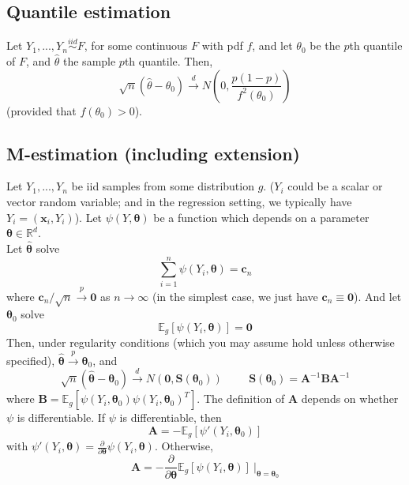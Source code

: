 \documentclass[11pt]{article}
\begin{document}
\subsection*{Quantile estimation}

Let $Y_1,...,Y_n \overset{iid}{\sim} F$, for some continuous $F$ with pdf $f$, and let $\theta_0$ be the $p$th quantile of $F$, and $\widehat{\theta}$ the sample $p$th quantile. Then,
$$\sqrt{n}(\widehat{\theta} - \theta_0) \overset{d}{\to} N\left(0, \frac{p(1-p)}{f^2(\theta_0)} \right)$$
(provided that $f(\theta_0) > 0$).

\subsection*{M-estimation (including extension)}

Let $Y_1,...,Y_n$ be iid samples from some distribution $g$. ($Y_i$ could be a scalar or vector random variable; and in the regression setting, we typically have $Y_i = (\mathbf{x}_i, Y_i)$). Let $\psi(Y, \boldsymbol{\theta})$ be a function which depends on a parameter $\boldsymbol{\theta} \in \mathbb{R}^d$.\\

\noindent Let $\widehat{\boldsymbol{\theta}}$ solve
$$\sum \limits_{i=1}^n \psi(Y_i, \boldsymbol{\theta}) = \boldsymbol{c}_n$$
where $\boldsymbol{c}_n/\sqrt{n} \overset{p}{\to} \boldsymbol{0}$ as $n \to \infty$ (in the simplest case, we just have $\boldsymbol{c}_n \equiv \boldsymbol{0}$). And let $\boldsymbol{\theta}_0$ solve
$$\mathbb{E}_g[\psi(Y_i, \boldsymbol{\theta})] = \boldsymbol{0}$$
Then, under regularity conditions (which you may assume hold unless otherwise specified), $\widehat{\boldsymbol{\theta}} \overset{p}{\to} \boldsymbol{\theta}_0$, and
$$\sqrt{n}(\widehat{\boldsymbol{\theta}} - \boldsymbol{\theta}_0) \overset{d}{\to} N(\boldsymbol{0}, \mathbf{S}(\boldsymbol{\theta}_0)) \hspace{1cm} \mathbf{S}(\boldsymbol{\theta}_0) = \mathbf{A}^{-1} \mathbf{B} \mathbf{A}^{-1}$$
where $\mathbf{B} = \mathbb{E}_g[\psi(Y_i, \boldsymbol{\theta}_0) \psi(Y_i, \boldsymbol{\theta}_0)^T]$. The definition of $\mathbf{A}$ depends on whether $\psi$ is differentiable. If $\psi$ is differentiable, then
$$\mathbf{A} = -\mathbb{E}_g\left[ \psi'(Y_i, \boldsymbol{\theta}_0) \right]$$
with $\psi'(Y_i, \boldsymbol{\theta}) = \frac{\partial}{\partial \boldsymbol{\theta}} \psi(Y_i, \boldsymbol{\theta})$. Otherwise,
$$\mathbf{A} = -\frac{\partial}{\partial \boldsymbol{\theta}} \mathbb{E}_g[\psi(Y_i, \boldsymbol{\theta})] \ \Biggr\lvert_{\boldsymbol{\theta} = \boldsymbol{\theta}_0}$$
\end{document}
